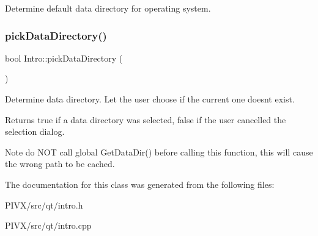 Determine default data directory for operating system. \mbox{\label{class_intro_a3e0e541cd0e55fe71484055964925cfc}} 
\subsubsection{\texorpdfstring{pick\+Data\+Directory()}{pickDataDirectory()}}
{\footnotesize\ttfamily bool Intro\+::pick\+Data\+Directory (\begin{DoxyParamCaption}{ }\end{DoxyParamCaption})\hspace{0.3cm}{\ttfamily [static]}}

Determine data directory. Let the user choose if the current one doesn\textquotesingle{}t exist.

\begin{DoxyReturn}{Returns}
true if a data directory was selected, false if the user cancelled the selection dialog.
\end{DoxyReturn}
\begin{DoxyNote}{Note}
do N\+OT call global Get\+Data\+Dir() before calling this function, this will cause the wrong path to be cached. 
\end{DoxyNote}


The documentation for this class was generated from the following files\+:\begin{DoxyCompactItemize}
\item 
P\+I\+V\+X/src/qt/intro.\+h\item 
P\+I\+V\+X/src/qt/intro.\+cpp\end{DoxyCompactItemize}
